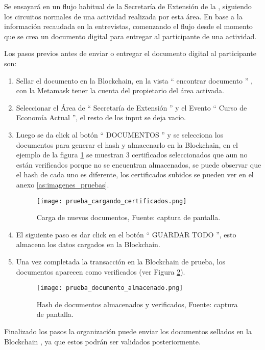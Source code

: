 Se ensayará en un flujo habitual de la Secretaría de Extensión de la , 
siguiendo los circuitos normales de una actividad realizada por esta área. En base a la información recaudada en la entrevistas\cite[]{larraburu_secretariextension_2020},
  comenzando el flujo desde el momento que se crea un documento digital para entregar 
al participante de una actividad.

Los pasos previos antes de  enviar o entregar el documento digital al participante son: 
\begin{enumerate}
  \item Sellar el documento en la Blockchain, en la vista “ encontrar documento ” , con la Metamask tener la cuenta del 
  propietario del área activada.
  \item Seleccionar el Área de “ Secretaría de Extensión ” y el Evento “ Curso de Economía Actual ”, el resto de los input se deja vacío.
  \item Luego se da click al botón “ DOCUMENTOS ” y se selecciona los documentos para  generar el hash y almacenarlo en la Blockchain, en el ejemplo de la figura \ref{img:nuevos_certificados} se muestran 3 certificados seleccionados
  que aun no están verificados porque no se encuentran almacenados, se puede observar que el hash de cada uno es diferente, los certificados subidos 
  se pueden ver en el anexo \ref{as:imagenes_pruebas}.
  \begin{figure}[H]
    \centering
    {\texttt{[image: prueba\_cargando\_certificados.png]}}
    \caption{Carga de nuevos documentos,  Fuente: captura de pantalla. }
    \label{img:nuevos_certificados}
  \end{figure}
  \item  El siguiente paso es dar click en el botón “ GUARDAR TODO ”, esto almacena los datos cargados en la Blockchain.
  \item Una vez completada la transacción en la  Blockchain de prueba, los documentos aparecen como verificados (ver Figura \ref{img:prueba_almacenamiento}).
  \begin{figure}[H]
    \centering
    {\texttt{[image: prueba\_documento\_almacenado.png]}}
    \caption{Hash de documentos almacenados y verificados,  Fuente: captura de pantalla. }
    \label{img:prueba_almacenamiento}
  \end{figure}
\end{enumerate}
Finalizado los pasos la organización puede enviar los documentos sellados en la  Blockchain , ya que estos
podrán ser validados posteriormente.

